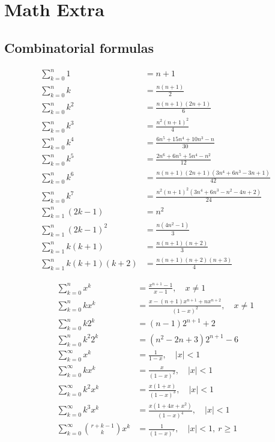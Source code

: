 \section{Math Extra}

\subsection{Combinatorial formulas}

\begin{align*}
\sum_{k=0}^{n}1 &= n+1\\
\sum_{k=0}^{n}k &= \frac{n(n+1)}{2}\\
\sum_{k=0}^{n}k^2 &= \frac{n(n+1)(2n+1)}{6}\\
\sum_{k=0}^{n}k^3 &= \frac{n^2(n+1)^2}{4}\\
\sum_{k=0}^{n}k^4 &= \frac{6n^5+15n^4+10n^3-n}{30}\\
\sum_{k=0}^{n}k^5 &= \frac{2n^6+6n^5+5n^4-n^2}{12}\\
\sum_{k=0}^{n}k^6 &= \frac{n(n+1)(2n+1)(3n^4+6n^3-3n+1)}{42}\\
\sum_{k=0}^{n}k^7 &= \frac{n^2(n+1)^2(3n^4+6n^3-n^2-4n+2)}{24}\\
\sum_{k=1}^{n}(2k-1) &= n^2\\
\sum_{k=1}^{n}(2k-1)^2 &= \frac{n(4n^2-1)}{3}\\
\sum_{k=1}^{n}k(k+1) &= \frac{n(n+1)(n+2)}{3}\\
\sum_{k=1}^{n}k(k+1)(k+2) &= \frac{n(n+1)(n+2)(n+3)}{4}
\end{align*}

\begin{align*}
\sum_{k=0}^{n}x^k &= \frac{x^{n+1}-1}{x-1},\quad x\ne1\\
\sum_{k=0}^{n}kx^k
&= \frac{x-(n+1)x^{n+1}+nx^{n+2}}{(1-x)^2},\quad x\ne1\\
\sum_{k=0}^{n}k2^k &= (n-1)2^{n+1}+2\\
\sum_{k=0}^{n}k^2 2^k &= (n^2-2n+3)2^{n+1}-6\\
\sum_{k=0}^{\infty}x^k &= \frac{1}{1-x},\quad |x|<1\\
\sum_{k=0}^{\infty}kx^k &= \frac{x}{(1-x)^2},\quad |x|<1\\
\sum_{k=0}^{\infty}k^2x^k &= \frac{x(1+x)}{(1-x)^3},\quad |x|<1\\
\sum_{k=0}^{\infty}k^3x^k &= \frac{x(1+4x+x^2)}{(1-x)^4},\quad |x|<1\\
\sum_{k=0}^{\infty}\binom{r+k-1}{k}x^k
&= \frac{1}{(1-x)^r},\quad |x|<1,\ r\ge1
\end{align*}

